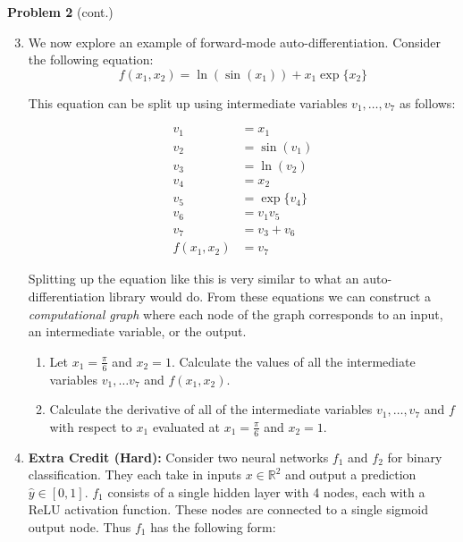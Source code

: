 \documentclass[submit]{harvardml}
\begin{document}
\begin{framed}
    \noindent\textbf{Problem 2} (cont.)\\
    \begin{enumerate}
    \setcounter{enumi}{2}
    
      \item  We now explore an example of forward-mode auto-differentiation. Consider the following 
          equation:
          $$
            f(x_1, x_2) = \ln (\sin (x_1)) + x_1 \exp \{ x_2 \}
          $$
    
          This equation can be split up using intermediate variables $v_1, \dots, v_7$ as follows:
    
          \begin{align*}
            v_1 &= x_1 \\ 
            v_2 &= \sin (v_1) \\
            v_3 &= \ln (v_2) \\
            v_4 &= x_2 \\
            v_5 &= \exp \{ v_4 \} \\
            v_6 &= v_1v_5 \\
            v_7 &= v_3 + v_6 \\
            f(x_1, x_2) &= v_7
          \end{align*}
    
            Splitting up the equation like this is very similar to what an auto-differentiation 
            library would do. From these equations we can construct a \textit{computational graph} 
            where each node of the graph corresponds to an input, an intermediate variable, or 
            the output. 
    
        \begin{enumerate}
            \item Let $x_1 = \frac{\pi}{6}$ and $x_2 = 1$. Calculate the values of all the 
                intermediate variables $v_1, \dots v_7$ and $f(x_1,x_2)$. 
            \item Calculate the derivative of
                all of the intermediate variables $v_1, \dots, v_7$ and
                $f$ with respect to $x_1$ evaluated 
                at $x_1 = \frac{\pi}{6}$ and $x_2 = 1$.  
    
        \end{enumerate}
    
    \item \textbf{Extra Credit (Hard):} Consider two neural networks $f_1$ and $f_2$ for binary 
        classification. They each take in inputs $x \in \mathbb{R}^2$ and output a 
        prediction $\hat{y} \in [0,1]$. $f_1$
        consists of a single hidden layer with 4 nodes, each with 
        a ReLU activation function. These nodes are connected to a single sigmoid output node. Thus 
        $f_1$ has the following form:
    

\end{enumerate}
\end{framed}
\end{document}

